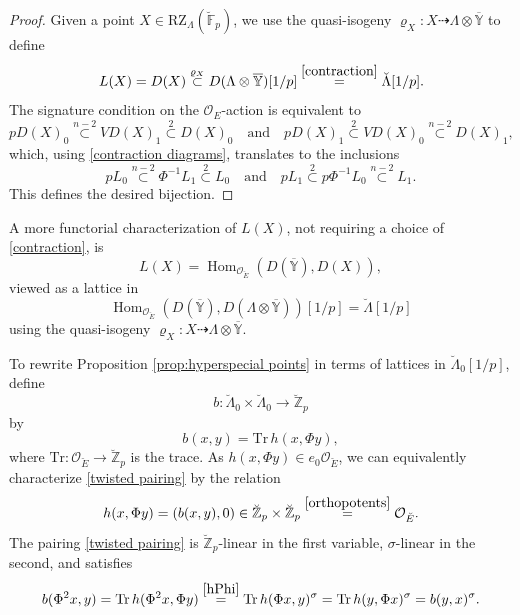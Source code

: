 \documentclass[11pt]{alggeom}
\newcommand{\Z}{\mathbb Z}
\newcommand{\F}{\mathbb F}
\newcommand{\co}{\mathcal O}
\DeclareMathOperator{\Hom}{Hom}
\begin{document}
\begin{proof}
Given a point  $X \in \mathrm{RZ}_\Lambda(\breve{\F}_p)$, we use the quasi-isogeny $\varrho_X :X \dashrightarrow \Lambda \otimes \overline{\mathbb{Y}}$ to define 
\begin{equation}\label{Ldef}
 L(X) = D(X)  \stackrel{\varrho_X}{\subset} D(\Lambda \otimes \overline{\mathbb{Y}}) [1/p]
 \stackrel{ \eqref{contraction}} {=} \breve{\Lambda}[1/p] . 
 \end{equation}
The signature condition on the $\co_E$-action is equivalent to
\[
pD(X)_0 \stackrel{n-2}{\subset} VD(X)_1 \stackrel{2}{\subset} D(X)_0 \quad \mbox{and}\quad
pD(X)_1 \stackrel{2}{\subset} VD(X)_0 \stackrel{n-2}{\subset} D(X)_1,
\]
which, using \eqref{contraction diagrams}, translates to the inclusions
\[
 pL_0  \stackrel{n-2}{\subset} \Phi^{-1} L_1 \stackrel{2}{\subset} L_0
\quad  \mbox{and}\quad
p L_1  \stackrel{2}{\subset} p \Phi^{-1} L_0  \stackrel{n-2}{\subset}   L_1.
\]
This defines the desired bijection.
\end{proof}




\begin{remark}
A more functorial characterization of $L(X)$, not requiring a choice of \eqref{contraction},  is 
\begin{equation}\label{canonical L}
L(X) = \Hom_{\co_{\breve{E}}}(D(\mathbb{\overline{Y}}) , D(X) ),
\end{equation}
viewed as a lattice in
\[
\Hom_{\co_{\breve{E}}}(D(\mathbb{\overline{Y}}) , D( \Lambda \otimes \overline{\mathbb{Y}} ))[1/p] 
= \breve{\Lambda}[1/p]
\]
using the quasi-isogeny $\varrho_X :X \dashrightarrow \Lambda \otimes \overline{\mathbb{Y}}$.
\end{remark}

To  rewrite Proposition \ref{prop:hyperspecial points} in terms of lattices in $\breve{\Lambda}_0[1/p]$, 
define 
\begin{equation}\label{twisted pairing}
b   : \breve{\Lambda}_0  \times \breve{\Lambda}_0 \to \breve{\Z}_p
\end{equation}
 by 
\[
b( x,y ) = \mathrm{Tr}\, h(x,\Phi y) ,
\]
where $\mathrm{Tr} : \co_{\breve{E}} \to \breve{\Z}_p$ is the trace.
As $h(x  , \Phi y ) \in  e_0 \co_{\breve{E}}$,  we can equivalently characterize \eqref{twisted pairing} by the relation
\[
h(x,\Phi y) = (  b(x,y) , 0  )  \in  \breve{\Z}_p \times \breve{\Z}_p \stackrel{\eqref{orthopotents}}{=}  \co_{\breve{E}} .
\]
The  pairing \eqref{twisted pairing} is $\breve{\Z}_p$-linear in the first variable,  $\sigma$-linear in the second, and satisfies
\[
b( \Phi^2 x,y )  =  \mathrm{Tr}\,  h( \Phi^2 x, \Phi y ) \stackrel{\eqref{hPhi}}{=} 
 \mathrm{Tr}\,  h( \Phi  x,  y )^\sigma 
 =  \mathrm{Tr}\,   h( y, \Phi  x  ) ^\sigma
=b( y,x ) ^\sigma.
\]
\end{document}
